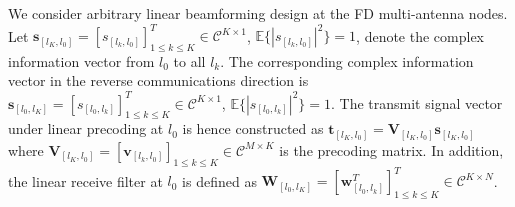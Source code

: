 \documentclass[onecolumn]{IEEEtran}
\begin{document}
We consider arbitrary linear beamforming design at the FD multi-antenna nodes. Let $\boldsymbol{s}_{[l_{K},l_{0}]} = [s_{[l_{k},l_{0}]}]^{T}_{1 \leq k \leq K} \in \mathcal{C}^{K \times 1}$, $\mathbb{E} \{ | s_{[l_{k},l_{0}]} |^{2} \} = 1$, denote the complex information vector from $l_{0}$ to all $l_{k}$. The corresponding complex information vector in the reverse communications direction is $\boldsymbol{s}_{[l_{0},l_{K}]} = [ s_{[l_{0},l_{k}]} ]^{T}_{1 \leq k \leq K} \in \mathcal{C}^{K \times 1}$, $\mathbb{E} \{ | s_{[l_{0},l_{k}]} |^2 \} = 1$. The transmit signal vector under linear precoding at $l_{0}$ is hence constructed as $\boldsymbol{t}_{[l_{K},l_{0}]} = \boldsymbol{V}_{[l_{K},l_{0}]} \boldsymbol{s}_{[l_{K},l_{0}]}$ where $\boldsymbol{V}_{[l_{K},l_{0}]} = [\boldsymbol{v}_{[l_{k},l_{0}]}]_{1 \leq k \leq K} \in \mathcal{C}^{M \times K}$ is the precoding matrix. In addition, the linear receive filter at $l_{0}$ is defined as $\boldsymbol{W}_{[l_{0},l_{K}]} = [ \boldsymbol{w}^{T}_{[l_{0},l_{k}]} ]^{T}_{1 \leq k \leq K} \in \mathcal{C}^{K \times N}$. 
\end{document}
